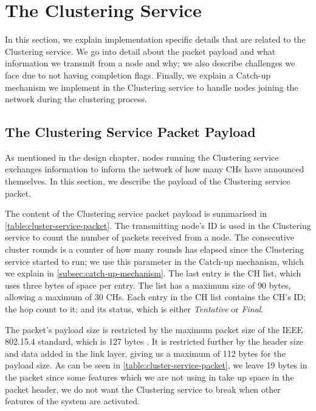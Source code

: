 \section{The Clustering Service}
In this section, we explain implementation specific details that are related to the Clustering service. We go into detail about the packet payload and what information we transmit from a node and why; we also describe challenges we face due to not having completion flags. Finally, we explain a Catch-up mechanism we implement in the Clustering service to handle nodes joining the network during the clustering process.

\subsection{The Clustering Service Packet Payload}
As mentioned in the design chapter, nodes running the Clustering service exchanges information to inform the network of how many CHs have announced themselves. In this section, we describe the payload of the Clustering service packet.

The content of the Clustering service packet payload is summarised in \cref{table:cluster-service-packet}. The transmitting node's ID is used in the Clustering service to count the number of packets received from a node. The consecutive cluster rounds is a counter of how many rounds has elapsed since the Clustering service started to run; we use this parameter in the Catch-up mechanism, which we explain in \cref{subsec:catch-up-mechanism}. The last entry is the CH list, which uses three bytes of space per entry. The list has a maximum size of 90 bytes, allowing a maximum of 30 CHs. Each entry in the CH list contains the CH's ID; the hop count to it; and its status, which is either \emph{Tentative} or \emph{Final}. 

The packet's payload size is restricted by the maximum packet size of the IEEE 802.15.4 standard, which is 127 bytes \cite{IEEE-802-15-4}. It is restricted further by the \atwo{} header size and data added in the link layer, giving us a maximum of 112 bytes for the payload size. As can be seen in \cref{table:cluster-service-packet}, we leave 19 bytes in the packet since some features which we are not using in \atwo{} take up space in the packet header, we do not want the Clustering service to break when other features of the \atwo{} system are activated.



